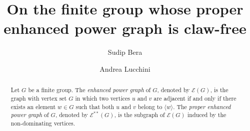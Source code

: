 \documentclass[preprint,11pt]{elsarticle}
\begin{document}
	
	
	
	\begin{frontmatter}
		
		
		
		\title{On the finite group whose proper enhanced power graph is claw-free}
		
		
		
		
		\author{Sudip Bera}
		\address{Faculty of Mathematics,\\ 
		Dhirubhai Ambani University, Gandhinagar \\ India} 
		\author{Andrea Lucchini}
		\address{Università di Padova, Dipartimento di Matematica “Tullio Levi-Civita”, Via Trieste 63, 35121 Padova,\\ Italy.}
		
	
		\begin{abstract}
\noindent Let $G$ be a finite group. The \emph{enhanced power graph} of $G$,
denoted by $\mathcal{E}(G)$, is the graph with vertex set $G$ in which two 
vertices $u$ and $v$ are adjacent if and only if there exists an element 
$w \in G$ such that both $u$ and $v$ belong to $\langle w \rangle$. The 
\emph{proper enhanced power graph} of $G$, denoted by $\mathcal{E}^{**}(G)$, 
is the subgraph of $\mathcal{E}(G)$ induced by the non-dominating vertices.


\end{abstract}
\end{frontmatter}
\end{document}
